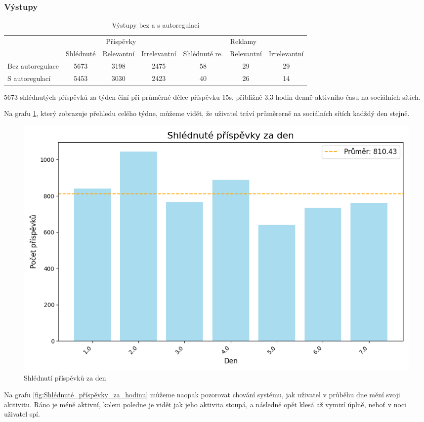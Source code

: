 \documentclass[11pt, a4paper]{article}
\begin{document}
\subsubsection{Výstupy}

\begin{table}[h]
    \centering
    \begin{tabular}{|l|c|c|c|c|c|c|}
        \hline
        & \multicolumn{3}{c|}{Příspěvky} & \multicolumn{3}{c|}{Reklamy} \\ 
        & Shlédnuté & Relevantní & Irrelevantní & Shlédnuté re. & Relevantní & Irrelevantní \\
        \hline
        Bez autoregulace & 5673 & 3198 & 2475 & 58 & 29 & 29 \\
        S autoregulací & 5453 & 3030 & 2423 & 40 & 26 & 14 \\
        \hline
    \end{tabular}
    \caption{Výstupy bez a s autoregulací}
    \label{tab:autoregulace}
\end{table}

5673 shlédnutých příspěvků za týden činí při průměrné délce příspěvku 15s, přibližně 3,3 hodin denně aktivního času na sociálních sítích.

Na grafu \ref{fig:Shlédnuté_příspěvky_za_den}, který zobrazuje přehledu celého týdne, můžeme vidět, že uživatel tráví průměrerně na sociálních sítích kadždý den stejně.
\begin{figure}[h]
    \centering
    \includegraphics[width=0.5\linewidth]{Shlédnuté_příspěvky_za_den.png}
    \caption{Shlédnutí příspěvků za den}
    \label{fig:Shlédnuté_příspěvky_za_den}
\end{figure}

\newpage
Na grafu \ref{fig:Shlédnuté_příspěvky_za_hodinu} můžeme naopak pozorovat chování systému, jak uživatel v průběhu dne mění svoji akitivitu.
Ráno je méně aktivní, kolem poledne je vidět jak jeho aktivita stoupá, a následně opět klesá až vymizí úplně, neboť v noci uživatel spí.
\end{document}
